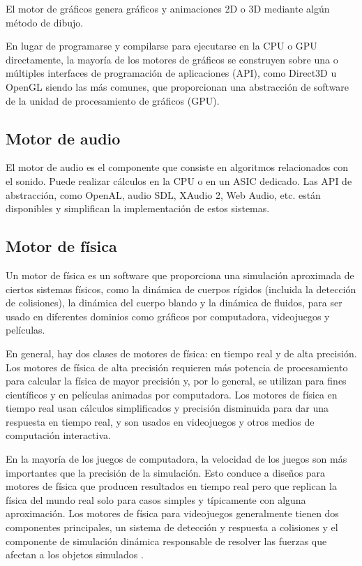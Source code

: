 El motor de gráficos genera gráficos y animaciones 2D o 3D mediante algún método de dibujo.

En lugar de programarse y compilarse para ejecutarse en la CPU o GPU directamente, la mayoría de los motores de gráficos se construyen sobre una o múltiples interfaces de programación de aplicaciones (API), como Direct3D u OpenGL siendo las más comunes, que proporcionan una abstracción de software de la unidad de procesamiento de gráficos (GPU).

\subsection{Motor de audio}

El motor de audio es el componente que consiste en algoritmos relacionados con el sonido. Puede realizar cálculos en la CPU o en un ASIC dedicado. Las API de abstracción, como OpenAL, audio SDL, XAudio 2, Web Audio, etc. están disponibles y simplifican la implementación de estos sistemas.

\subsection{Motor de física}

Un motor de física es un software que proporciona una simulación aproximada de ciertos sistemas físicos, como la dinámica de cuerpos rígidos (incluida la detección de colisiones), la dinámica del cuerpo blando y la dinámica de fluidos, para ser usado en diferentes dominios como gráficos por computadora, videojuegos y películas.

En general, hay dos clases de motores de física: en tiempo real y de alta precisión. Los motores de física de alta precisión requieren más potencia de procesamiento para calcular la física de mayor precisión y, por lo general, se utilizan para fines científicos y en películas animadas por computadora. Los motores de física en tiempo real usan cálculos simplificados y precisión disminuida para dar una respuesta en tiempo real, y son usados en videojuegos y otros medios de computación interactiva.

En la mayoría de los juegos de computadora, la velocidad de los juegos son más importantes que la precisión de la simulación. Esto conduce a diseños para motores de física que producen resultados en tiempo real pero que replican la física del mundo real solo para casos simples y típicamente con alguna aproximación. Los motores de física para videojuegos generalmente tienen dos componentes principales, un sistema de detección y respuesta a colisiones y el componente de simulación dinámica responsable de resolver las fuerzas que afectan a los objetos simulados \cite{JasonGregory-GameEngineArchitecture}.

